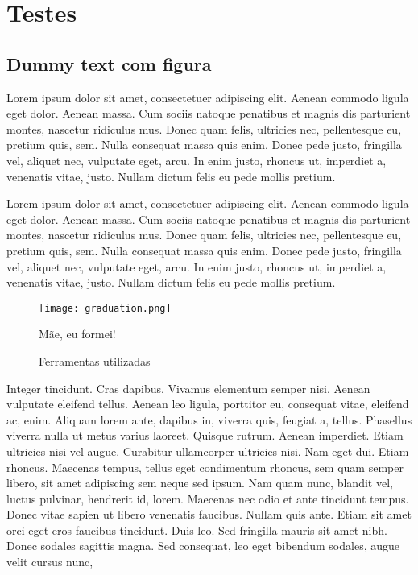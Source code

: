 \chapter{Testes}  
\label{chap: testes}

\section{Dummy text com figura}

Lorem ipsum dolor sit amet, consectetuer adipiscing elit. Aenean commodo ligula eget dolor. Aenean massa. Cum sociis natoque penatibus et magnis dis parturient montes, nascetur ridiculus mus. Donec quam felis, ultricies nec, pellentesque eu, pretium quis, sem. Nulla consequat massa quis enim. Donec pede justo, fringilla vel, aliquet nec, vulputate eget, arcu. In enim justo, rhoncus ut, imperdiet a, venenatis vitae, justo. Nullam dictum felis eu pede mollis pretium.

Lorem ipsum dolor sit amet, consectetuer adipiscing elit. Aenean commodo ligula eget dolor. Aenean massa. Cum sociis natoque penatibus et magnis dis parturient montes, nascetur ridiculus mus. Donec quam felis, ultricies nec, pellentesque eu, pretium quis, sem. Nulla consequat massa quis enim. Donec pede justo, fringilla vel, aliquet nec, vulputate eget, arcu. In enim justo, rhoncus ut, imperdiet a, venenatis vitae, justo. Nullam dictum felis eu pede mollis pretium.

\begin{figure}[ht]
  \caption{Mãe, eu formei!}
  \label{fig: fig1}
  \centering
  \texttt{[image: graduation.png]}
  
\end{figure}

\begin{figure}[ht]
  \caption{Ferramentas utilizadas}
  \label{fig: fig2}
  \centering
  \hfill
  \hfill
  
\end{figure}

Integer tincidunt. Cras dapibus. Vivamus elementum semper nisi. Aenean vulputate eleifend tellus. Aenean leo ligula, porttitor eu, consequat vitae, eleifend ac, enim. Aliquam lorem ante, dapibus in, viverra quis, feugiat a, tellus. Phasellus viverra nulla ut metus varius laoreet. Quisque rutrum. Aenean imperdiet. Etiam ultricies nisi vel augue. Curabitur ullamcorper ultricies nisi. Nam eget dui. Etiam rhoncus. Maecenas tempus, tellus eget condimentum rhoncus, sem quam semper libero, sit amet adipiscing sem neque sed ipsum. Nam quam nunc, blandit vel, luctus pulvinar, hendrerit id, lorem. Maecenas nec odio et ante tincidunt tempus. Donec vitae sapien ut libero venenatis faucibus. Nullam quis ante. Etiam sit amet orci eget eros faucibus tincidunt. Duis leo. Sed fringilla mauris sit amet nibh. Donec sodales sagittis magna. Sed consequat, leo eget bibendum sodales, augue velit cursus nunc,

